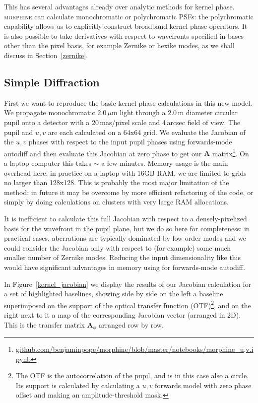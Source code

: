 \documentclass[modern]{aastex63}
\begin{document}
This has several advantages already over analytic methods for kernel phase. \textsc{morphine} can calculate monochromatic or polychromatic PSFs: the polychromatic capability allows us to explicitly construct broadband kernel phase operators. It is also possible to take derivatives with respect to wavefronts specified in bases other than the pixel basis, for example Zernike or hexike modes, as we shall discuss in Section~\ref{zernike}.

\subsection{Simple Diffraction}
\label{sec:simple}

First we want to reproduce the basic kernel phase calculations in this new model. We propagate monochromatic 2.0\,$\mu$m light through a 2.0\,m diameter circular pupil onto a detector with a 20\,mas/pixel scale and 4\,arcsec field of view. The pupil and $u,v$ are each calculated on a 64x64 grid. We evaluate the Jacobian of the $u,v$ phases with respect to the input pupil phases using forwards-mode autodiff and then evaluate this Jacobian at zero phase to get our $\mathbf{A}$ matrix\footnote{\href{https://github.com/benjaminpope/morphine/blob/master/notebooks/morphine_u,v.ipynb}{github.com/benjaminpope/morphine/blob/master/notebooks/morphine\_u,v.ipynb}}. On a laptop computer this takes $\sim$ a few minutes. Memory usage is the main overhead here: in practice on a laptop with 16GB RAM, we are limited to grids no larger than 128x128. This is probably the most major limitation of the method; in future it may be overcome by more efficient refactoring of the code, or simply by doing calculations on clusters with very large RAM allocations.

It is inefficient to calculate this full Jacobian with respect to a densely-pixelized basis for the wavefront in the pupil plane, but we do so here for completeness: in practical cases, aberrations are typically dominated by low-order modes and we could consider the Jacobian only with respect to (for example) some much smaller number of Zernike modes. Reducing the input dimensionality like this would have significant advantages in memory using for forwards-mode autodiff.

In Figure~\ref{kernel_jacobian} we display the results of our Jacobian calculation for a set of highlighted baselines, showing side by side on the left a baseline superimposed on the support of the optical transfer function (OTF)\footnote{The OTF is the autocorrelation of the pupil, and is in this case also a circle. Its support is calculated by calculating a $u,v$ forwards model with zero phase offset and making an amplitude-threshold mask.}, and on the right next to it a map of the corresponding Jacobian vector (arranged in 2D). This is the transfer matrix $\mathbf{A}_\phi$ arranged row by row.  
\end{document}
